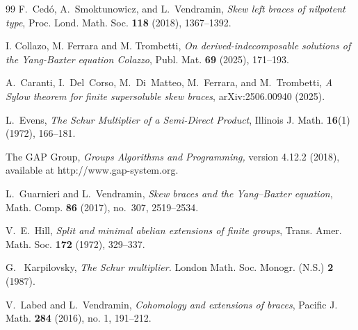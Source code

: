 \documentclass[11pt]{amsart}
\theoremstyle{thrm}
\theoremstyle{plain}
\theoremstyle{definition}
\numberwithin{equation}{section}
\begin{document}
\begin{thebibliography}{99}
	 F.~Cedó, A.~Smoktunowicz, and L.~Vendramin, \textit{Skew left braces of nilpotent type}, Proc. Lond. Math. Soc. \textbf{118} (2018), 1367--1392.
	
I. Collazo, M. Ferrara and M. Trombetti,  \textit{On derived-indecomposable solutions of the Yang-Baxter equation
Colazzo},  Publ. Mat. \textbf{69} (2025), 171--193.
	
	A.~Caranti, I.~Del~Corso, M.~Di~Matteo, M.~Ferrara, and M.~Trombetti, 
	\textit{A Sylow theorem for finite supersoluble skew braces}, 
	arXiv:2506.00940 (2025).
	
 L.~Evens, \textit{The Schur Multiplier of a Semi-Direct Product}, Illinois J. Math. \textbf{16}(1) (1972), 166--181.	


The GAP Group, \emph{Groups Algorithms and Programming,}  version 4.12.2 (2018), available at  http://www.gap-system.org.
	
 L.~Guarnieri and L.~Vendramin, \textit{Skew braces and the Yang--Baxter equation}, Math. Comp. \textbf{86} (2017), no.~307, 2519--2534.
	
	
V.~E.~Hill, 
\emph{Split and minimal abelian extensions of finite groups},
Trans. Amer. Math. Soc. \textbf{172} (1972), 329--337.	
	
	
	
	G.~ Karpilovsky, \textit{The Schur multiplier.} London Math. Soc. Monogr. (N.S.) \textbf{2} (1987).

	
	 V.~Labed and L.~Vendramin, \textit{Cohomology and extensions of braces},  Pacific J. Math. \textbf{284} (2016), no. 1, 191--212.
	
	

\end{thebibliography}
\end{document}
